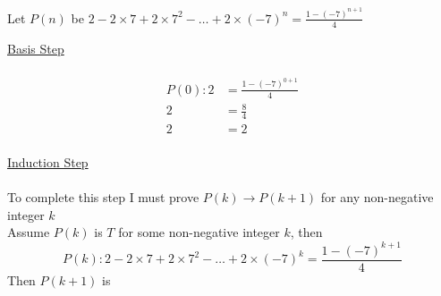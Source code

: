 \documentclass[12pt letter]{report}
\begin{document}
\begin{myproof}

  Let $P \left( n \right) $ be $2 - 2 \times 7 + 2 \times 7^2 - \ldots + 2 \times \left( - 7 \right)^{n} = \frac{1 - \left( -7  \right)^{n + 1} }{4}$

  \noindent \underline{Basis Step} \\
  \\
  \begin{align*}
    P \left( 0 \right): 2 & = \frac{1 - \left( -7  \right)^{0 + 1} }{4} \\
    2                     & = \frac{8}{4}                               \\
    2                     & = 2                                         \\
  \end{align*}

  \noindent \underline{Induction  Step} \\
  \\
  To complete this step I must prove $P \left( k \right) \to P \left( k + 1 \right)  $ for any non-negative integer $k$ \\
  Assume $P \left( k \right) $ is $T$  for some non-negative integer $k$, then \\
  \[
    P \left( k \right): 2 - 2 \times 7 + 2 \times 7^2 - \ldots + 2 \times \left( - 7 \right)^{k} = \frac{1 - \left( -7
      \right)^{k + 1} }{4}
  \]
  Then $P \left( k + 1 \right) $ is


\end{myproof}
\end{document}

